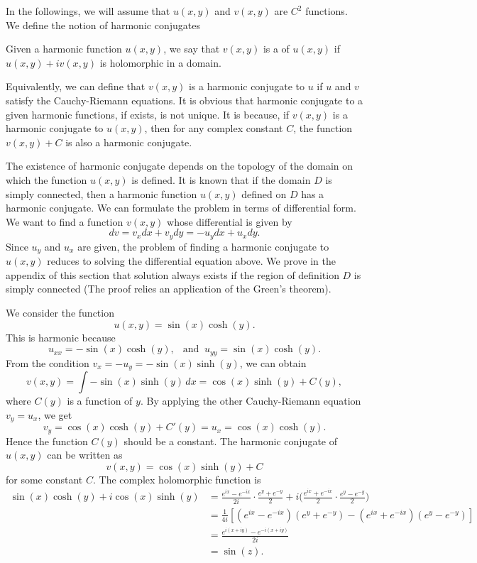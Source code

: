 In the followings, we will assume that $u(x,y)$ and $v(x,y)$ are $C^2$ functions. We define the notion of harmonic conjugates

\begin{svgraybox}
	\begin{definition} 
		Given a harmonic function $u(x,y)$, we say that $v(x,y)$ is a  of $u(x,y)$ if $u(x,y) + iv(x,y)$ is holomorphic in a domain.
	\end{definition}
\end{svgraybox}

Equivalently, we can define that $v(x,y)$ is a harmonic conjugate to $u$ if $u$ and $v$ satisfy the Cauchy-Riemann equations. It is obvious that  harmonic conjugate to a given harmonic functions, if exists, is not unique. It is because, if $v(x,y)$ is a harmonic conjugate to $u(x,y)$, then for any complex constant $C$, the function $v(x,y)+C$ is also a harmonic conjugate.

The existence of harmonic conjugate depends on the topology of the domain on which the function $u(x,y)$ is defined. It is known that if the domain $D$ is simply connected, then a harmonic function $u(x,y)$ defined on $D$ has a harmonic conjugate. We can formulate the problem in terms of differential form. We want to find  a function $v(x,y)$ whose differential is given by
$$
dv = v_xdx + v_y dy = -u_y dx + u_x dy.
$$
Since $u_y$ and $u_x$ are given, the problem of finding a harmonic conjugate to $u(x,y)$ reduces to solving the differential equation above. We prove in the appendix of this section that solution always exists if the region of definition $D$ is simply connected (The proof relies an application of the Green's theorem).

\begin{example}
	We consider the function $$u(x,y) = \sin(x) \cosh(y).$$ This is harmonic because 
	$$
	u_{xx} = - \sin(x) \cosh(y), \ \ \text{ and } \ u_{yy} = \sin (x) \cosh(y).
	$$		
	From the condition $v_x= -u_y = -\sin(x) \sinh(y)$, we can obtain
	$$
	v(x,y) = \int -\sin(x) \sinh(y) \, dx = \cos(x) \sinh(y) + C(y),
	$$
	where $C(y)$ is a function of $y$. By applying the other Cauchy-Riemann equation $v_y =  u_x$, we get
	$$
	v_y = \cos(x)\cosh(y) + C'(y) = u_x = \cos(x)\cosh(y).
	$$
	Hence the function $C(y)$ should be a constant. The harmonic conjugate of $u(x,y)$ can be written as
	$$
	v(x,y) = \cos(x) \sinh(y) + C
	$$
	for some constant $C$. The complex holomorphic function is
	\begin{align*}
		\sin(x) \cosh(y) + i \cos(x) \sinh(y) &= 
		\frac{e^{ix} - e^{-ix}}{2i} \cdot  \frac{e^{y} + e^{-y}}{2} + i 
		\Big(\frac{e^{ix} + e^{-ix}}{2} \cdot \frac{e^{y} - e^{-y}}{2} \Big) \\
		&= \frac{1}{4i}[(e^{ix}- e^{-ix})(e^y + e^{-y}) - (e^{ix}+ e^{-ix})(e^y - e^{-y})] \\
		&= \frac{e^{i(x+iy)} - e^{-i(x+iy)}}{2i} \\
		&= \sin(z).
	\end{align*}
\end{example}


